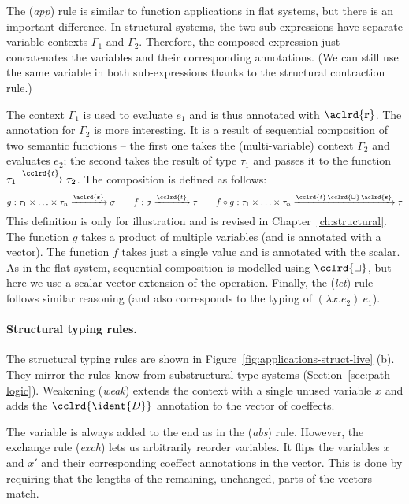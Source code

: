 The (\emph{app}) rule is similar to function applications in flat systems, but there is an important
difference. In structural systems, the two sub-expressions have separate variable contexts
$\Gamma_1$ and $\Gamma_2$. Therefore, the composed expression just concatenates the variables
and their corresponding annotations. (We can still use the same variable in both sub-expressions
thanks to the structural contraction rule.)

The context $\Gamma_1$ is used to evaluate $e_1$ and is thus annotated with $\aclrd{\mathbf{r}}$.
The annotation for $\Gamma_2$ is more interesting. It is a result of sequential composition of two
semantic functions -- the first one takes the (multi-variable) context $\Gamma_2$ and evaluates
$e_2$; the second takes the result of type $\tau_1$ and passes it to the function $\tau_1 \xrightarrow{\cclrd{t}} \tau_2$.
The composition is defined as follows:
%
\begin{equation*}
g : \tau_1 \times \ldots \times \tau_n \xrightarrow{\aclrd{\mathbf{s}}} \sigma
\qquad
f : \sigma \xrightarrow{\cclrd{t}} \tau
\qquad
f \circ g : \tau_1 \times \ldots \times \tau_n \xrightarrow{\cclrd{t} \,\cclrd{\sqcup}\, \aclrd{\mathbf{s}}} \tau
\end{equation*}
%
This definition is only for illustration and is revised in Chapter~\ref{ch:structural}. The function
$g$ takes a product of multiple variables (and is annotated with a vector). The function $f$ takes
just a single value and is annotated with the scalar. As in the flat system, sequential composition
is modelled using $\cclrd{\sqcup}$, but here we use a scalar-vector extension of the operation. Finally,
the (\emph{let}) rule follows similar reasoning (and also corresponds to the typing of $(\lambda x.e_2)~e_1$).

\paragraph{Structural typing rules.}
The structural typing rules are shown in Figure~\ref{fig:applications-struct-live} (b). They mirror
the rules know from substructural type systems (Section~\ref{sec:path-logic}). Weakening (\emph{weak})
extends the context with a single unused variable $x$ and adds the $\cclrd{\ident{D}}$ annotation to the
vector of coeffects.

The variable is always added to the end as in the (\emph{abs}) rule. However, the exchange rule
(\emph{exch}) lets us arbitrarily reorder variables. It flips the variables $x$ and $x'$ and their
corresponding coeffect annotations in the vector. This is done by requiring that the lengths of the
remaining, unchanged, parts of the vectors match.

